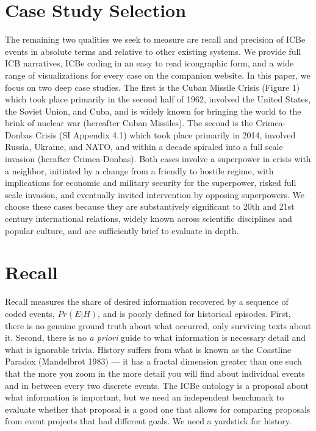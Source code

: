 \documentclass{article}
\begin{document}
\hypertarget{case-study-selection}{%
\section{Case Study Selection}\label{case-study-selection}}

The remaining two qualities we seek to measure are recall and precision
of ICBe events in absolute terms and relative to other existing systems.
We provide full ICB narratives, ICBe coding in an easy to read
icongraphic form, and a wide range of visualizations for every case on
the companion website. In this paper, we focus on two deep case studies.
The first is the Cuban Missile Crisis (Figure 1) which took place
primarily in the second half of 1962, involved the United States, the
Soviet Union, and Cuba, and is widely known for bringing the world to
the brink of nuclear war (hereafter Cuban Missiles). The second is the
Crimea-Donbas Crisis (SI Appendix 4.1) which took place primarily in
2014, involved Russia, Ukraine, and NATO, and within a decade spiraled
into a full scale invasion (herafter Crimea-Donbas). Both cases involve
a superpower in crisis with a neighbor, initiated by a change from a
friendly to hostile regime, with implications for economic and military
security for the superpower, risked full scale invasion, and eventually
invited intervention by opposing superpowers. We choose these cases
because they are substantively significant to 20th and 21st century
international relations, widely known across scientific disciplines and
popular culture, and are sufficiently brief to evaluate in depth.

\hypertarget{recall}{%
\section{Recall}\label{recall}}

Recall measures the share of desired information recovered by a sequence
of coded events, \(Pr(E|H)\), and is poorly defined for historical
episodes. First, there is no genuine ground truth about what occurred,
only surviving texts about it. Second, there is no \textit{a priori}
guide to what information is necessary detail and what is ignorable
trivia. History suffers from what is known as the Coastline Paradox
(Mandelbrot 1983) --- it has a fractal dimension greater than one such
that the more you zoom in the more detail you will find about individual
events and in between every two discrete events. The ICBe ontology is a
proposal about what information is important, but we need an independent
benchmark to evaluate whether that proposal is a good one that allows
for comparing proposals from event projects that had different goals. We
need a yardstick for history.
\end{document}
